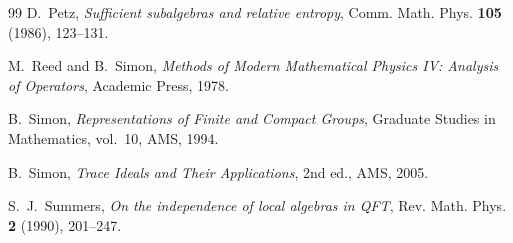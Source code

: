 \documentclass[11pt,a4paper]{article}
\theoremstyle{plain}
\theoremstyle{definition}
\theoremstyle{remark}
\begin{document}
\begin{thebibliography}{99}
 D.~Petz, \emph{Sufficient subalgebras and relative entropy},
Comm. Math. Phys. \textbf{105} (1986), 123--131.

 M.~Reed and B.~Simon, \emph{Methods of Modern Mathematical
Physics IV: Analysis of Operators}, Academic Press, 1978.

 B.~Simon, \emph{Representations of Finite and Compact Groups},
Graduate Studies in Mathematics, vol.~10, AMS, 1994.

 B.~Simon, \emph{Trace Ideals and Their Applications}, 2nd ed.,
AMS, 2005.

 S.~J.~Summers, \emph{On the independence of local algebras in
QFT}, Rev. Math. Phys. \textbf{2} (1990), 201--247.

\end{thebibliography}
\end{document}
